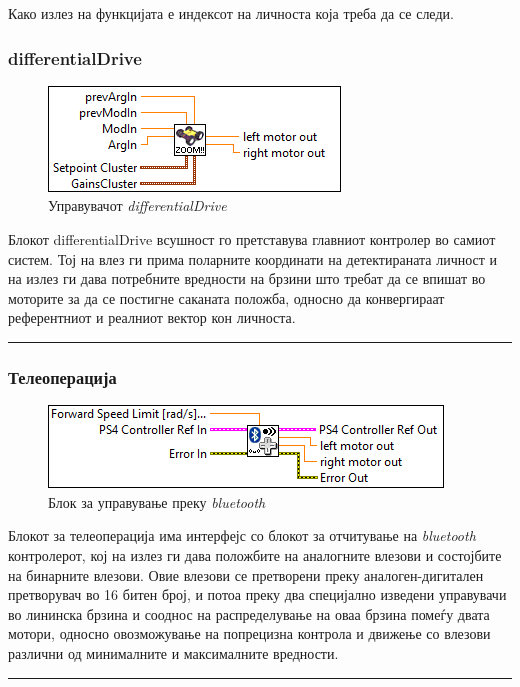 \documentclass[12pt]{article}
\begin{document}
        Како излез на функцијата е индексот на личноста која треба да се следи.

    \subsubsection{differentialDrive}
	    \begin{figure}[H]
	      \includegraphics[width=0.55\linewidth]{./images/differential_drive_border.png}
		    \caption{Управувачот \textit{differentialDrive}}
	      \label{fig:diffDrive}
	      \raggedright
	      \end{figure}
      Блокот differentialDrive всушност го претставува главниот контролер во самиот систем. Тој на влез ги прима поларните координати на детектираната личност и на излез ги дава потребните вредности на брзини што требат да се впишат во моторите за да се постигне саканата положба, односно да конвергираат референтниот и реалниот вектор кон личноста. %
      \textcolor[RGB]{150,150,150}{\rule{\linewidth}{1.6pt}}

    \subsubsection{Телеоперација}
	    \begin{figure}[H]
	      \includegraphics[width=0.55\linewidth]{./images/teleop_tooltip_border.png}
		    \caption{Блок за управување преку \textit{bluetooth}}
	      \label{fig:teleop}
	      \raggedright
	      \end{figure}
	    Блокот за телеоперација има интерфејс со блокот за отчитување на \textit{bluetooth} контролерот, кој на излез ги дава положбите на аналогните влезови и состојбите на бинарните влезови. Овие влезови се претворени преку аналоген-дигитален претворувач во 16 битен број, и потоа преку два специјално изведени управувачи во лининска брзина и сооднос на распределување на оваа брзина помеѓу двата мотори, односно овозможување на попрецизна контрола и движење со влезови различни од минималните и максималните вредности.
      \textcolor[RGB]{150,150,150}{\rule{\linewidth}{1.6pt}}
\end{document}
